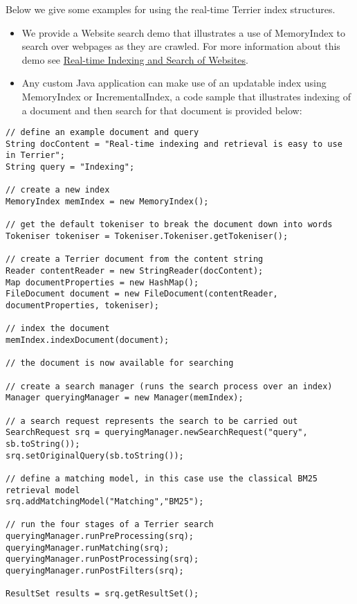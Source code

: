 Below we give some examples for using the real-time Terrier index
structures.

\begin{itemize}
\tightlist
\item
  We provide a Website search demo that illustrates a use of MemoryIndex
  to search over webpages as they are crawled. For more information
  about this demo see \href{website_search.html}{Real-time Indexing and
  Search of Websites}.
\item
  Any custom Java application can make use of an updatable index using
  MemoryIndex or IncrementalIndex, a code sample that illustrates
  indexing of a document and then search for that document is provided
  below:
\end{itemize}

\begin{verbatim}
// define an example document and query
String docContent = "Real-time indexing and retrieval is easy to use in Terrier";
String query = "Indexing";

// create a new index
MemoryIndex memIndex = new MemoryIndex();

// get the default tokeniser to break the document down into words
Tokeniser tokeniser = Tokeniser.Tokeniser.getTokeniser();

// create a Terrier document from the content string
Reader contentReader = new StringReader(docContent);
Map documentProperties = new HashMap();
FileDocument document = new FileDocument(contentReader, documentProperties, tokeniser);

// index the document
memIndex.indexDocument(document);

// the document is now available for searching

// create a search manager (runs the search process over an index)
Manager queryingManager = new Manager(memIndex);

// a search request represents the search to be carried out
SearchRequest srq = queryingManager.newSearchRequest("query", sb.toString());
srq.setOriginalQuery(sb.toString());

// define a matching model, in this case use the classical BM25 retrieval model
srq.addMatchingModel("Matching","BM25");

// run the four stages of a Terrier search
queryingManager.runPreProcessing(srq);
queryingManager.runMatching(srq);
queryingManager.runPostProcessing(srq);
queryingManager.runPostFilters(srq);

ResultSet results = srq.getResultSet();
\end{verbatim}

